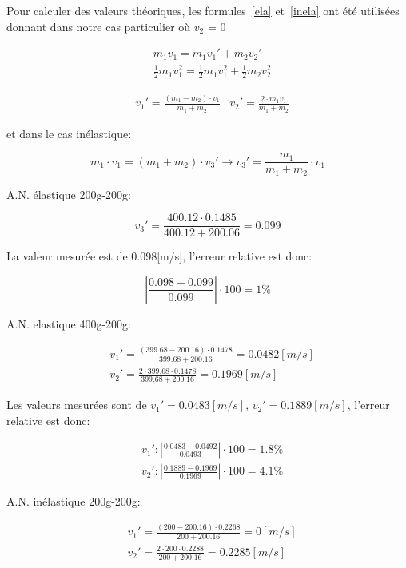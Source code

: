 Pour calculer des valeurs théoriques, les formules~\eqref{ela} et~\eqref{inela} ont été utilisées donnant dans notre cas particulier où $v_2$ = 0

\begin{align}
    & m_1 v_1 = m_1 v_1' + m_2 v_2'\\
    & \frac{1}{2} m_1 v_1^2 = \frac{1}{2}m_1 v_1^2 + \frac{1}{2} m_2 v_2^2
\end{align}

\begin{align}
    & v_1' = \frac{( m_1 - m_2)\cdot v_1}{m_1 + m_2}
    & v_2' = \frac{2\cdot m_1 v_1}{m_1 + m_2}
\end{align}

et dans le cas inélastique:

\begin{equation}
    m_1 \cdot v_1 = (m_1 + m_2) \cdot v_3' \rightarrow v_3' = \frac{m_1}{m_1+m_2}\cdot v_1
\end{equation}

A.N. élastique 200g-200g:

\begin{equation}
    v_3' = \frac{400.12\cdot 0.1485}{400.12 + 200.06} = 0.099
\end{equation}

La valeur mesurée est de 0.098[m/s], l'erreur relative est donc:

\begin{equation}
    |\frac{0.098-0.099}{0.099}|\cdot 100 = 1\%
\end{equation}


A.N. elastique 400g-200g:

\begin{align}
    & v_1' = \frac{(399.68-200.16)\cdot 0.1478}{399.68 + 200.16} = 0.0482[m/s]\\
    & v_2' = \frac{2\cdot 399.68\cdot 0.1478}{399.68 + 200.16} = 0.1969[m/s]
\end{align}

Les valeurs mesurées sont de $v_1' = 0.0483 [m/s]$, $v_2' = 0.1889[m/s]$, l'erreur relative est donc:

\begin{align}
    & v_1' : |\frac{0.0483-0.0492}{0.0493}|\cdot 100 = 1.8\%\\
    & v_2' : |\frac{0.1889-0.1969}{0.1969}|\cdot 100 = 4.1\%
\end{align}


A.N. inélastique 200g-200g:

\begin{align}
    & v_1' = \frac{(200-200.16)\cdot 0.2268}{200 + 200.16} = 0[m/s]\\
    & v_2' = \frac{2\cdot 200\cdot 0.2288}{200 + 200.16} = 0.2285[m/s]
\end{align}


